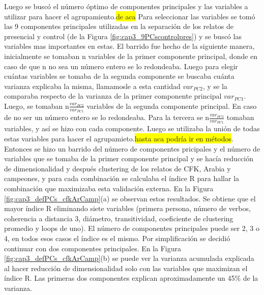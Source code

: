 Luego se buscó el número óptimo de componentes principales y las variables a utilizar para hacer el agrupamiento.\colorbox{yellow}{de aca} Para seleccionar las variables se tomó las 9 componentes principales utilizadas en la separación de los relatos de presencial y control (de la Figura \ref{fig:cap3_9PCscontrolpres}) y se buscó las variables mas importantes en estas. El barrido fue hecho de la siguiente manera, inicialmente se tomaban n variables de la primer componente principal, donde en caso de que n no sea un número entero se lo redondeaba. Luego para elegir cuántas variables se tomaba de la segunda componente se buscaba cuánta varianza explicaba la misma, llamamosle a esta cantidad $var_{PC2}$, y se la comparaba respecto de la varianza de la primer componente principal $var_{PC1}$. Luego, se tomaban n$\frac{var_{PC2}}{var_{PC1}}$ variables de la segunda componente principal. En caso de no ser un número entero se lo redondeaba. Para la tercera se n$\frac{var_{PC3}}{var_{PC1}}$ tomaban variables, y así se hizo con cada componente. Luego se utilizaba la unión de todas estas variables para hacer el agrupamieto.\colorbox{yellow}{hasta aca podría ir en métodos}. 
Entonces se hizo un barrido del número de componentes pricipales y el número de variables que se tomaba de la primer componente principal y se hacía reducción de dimensionalidad y después clustering de los relatos de CFK, Arabia y campeones, y para cada combinación se calculaba el índice R para hallar la combinación que maximizaba esta validación externa. En la Figura \ref{fig:cap3_defPCs_cfkArCamp}(a) se observan estos resultados. Se obtiene que el mayor índice R eliminando siete variables (primera persona, número de verbos, coherencia a distancia 3, diámetro, transitividad, coeficiente de clustering promedio y loops de uno). El número de componentes principales puede ser 2, 3 o 4, en todos esos casos el índice es el mismo. Por simplificación se decidió continuar con dos componentes principales. En la Figura \ref{fig:cap3_defPCs_cfkArCamp}(b) se puede ver la varianza acumulada explicada al hacer reducción de dimensionalidad solo con las variables que maximizan el índice R. Las primeras dos componentes explican aproximadamente un 45$\%$ de la varianza.

